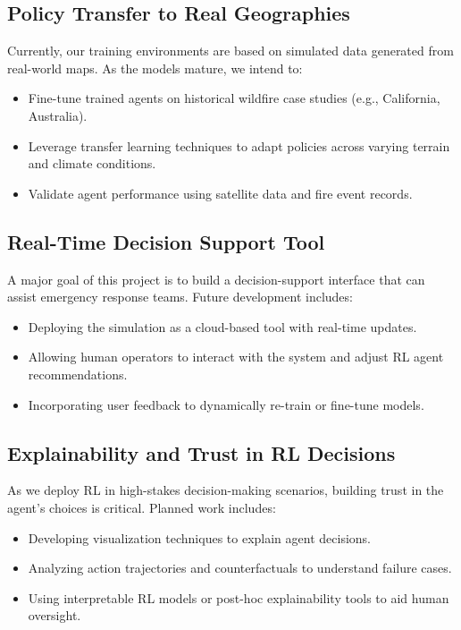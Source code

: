\documentclass[conference]{IEEEtran}
\begin{document}
\subsection{Policy Transfer to Real Geographies}
Currently, our training environments are based on simulated data generated from real-world maps. As the models mature, we intend to:

\begin{itemize}
\item Fine-tune trained agents on historical wildfire case studies (e.g., California, Australia).
\item Leverage transfer learning techniques to adapt policies across varying terrain and climate conditions.
\item Validate agent performance using satellite data and fire event records.
\end{itemize}

\subsection{Real-Time Decision Support Tool}
A major goal of this project is to build a decision-support interface that can assist emergency response teams. Future development includes:

\begin{itemize}
\item Deploying the simulation as a cloud-based tool with real-time updates.
\item Allowing human operators to interact with the system and adjust RL agent recommendations.
\item Incorporating user feedback to dynamically re-train or fine-tune models.
\end{itemize}

\subsection{Explainability and Trust in RL Decisions}
As we deploy RL in high-stakes decision-making scenarios, building trust in the agent's choices is critical. Planned work includes:

\begin{itemize}
\item Developing visualization techniques to explain agent decisions.
\item Analyzing action trajectories and counterfactuals to understand failure cases.
\item Using interpretable RL models or post-hoc explainability tools to aid human oversight.
\end{itemize}
\end{document}
